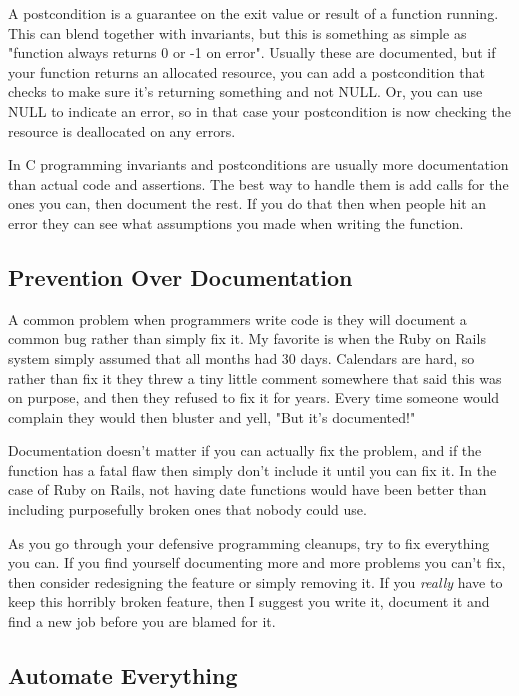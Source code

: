 A postcondition is a guarantee on the exit value or result of a function running.  This can blend together with
invariants, but this is something as simple as "function always returns 0 or -1 on error".  Usually these are
documented, but if your function returns an allocated resource, you can add a postcondition that checks to make
sure it's returning something and not NULL.  Or, you can use NULL to indicate an error, so in that case your
postcondition is now checking the resource is deallocated on any errors.

In C programming invariants and postconditions are usually more documentation than actual code and assertions.
The best way to handle them is add  calls for the ones you can, then document the rest.  If you
do that then when people hit an error they can see what assumptions you made when writing the function.

\subsection{Prevention Over Documentation}

A common problem when programmers write code is they will document a common bug rather than simply fix it.
My favorite is when the Ruby on Rails system simply assumed that all months had 30 days.  Calendars are hard,
so rather than fix it they threw a tiny little comment somewhere that said this was on purpose, and then they
refused to fix it for years.  Every time someone would complain they would then bluster and yell, "But it's documented!"

Documentation doesn't matter if you can actually fix the problem, and if the function has a fatal flaw then
simply don't include it until you can fix it.  In the case of Ruby on Rails, not having date functions would
have been better than including purposefully broken ones that nobody could use.

As you go through your defensive programming cleanups, try to fix everything you can.  If you find yourself
documenting more and more problems you can't fix, then consider redesigning the feature or simply removing 
it.  If you \emph{really} have to keep this horribly broken feature, then I suggest you write it, document
it and find a new job before you are blamed for it.

\subsection{Automate Everything}

